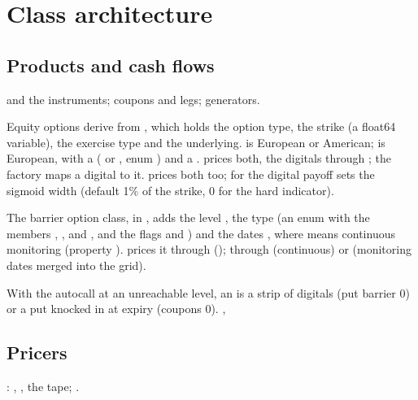\section{Class architecture}\label{sec:arch-classes}

\subsection{Products and cash flows}\label{sec:arch-products}
 and the instruments;  coupons and legs; generators.

\pending

Equity options derive from , which holds the option type, the strike (a float64 variable), the
exercise type and the underlying.  is European or American;  is European, with a
 ( or , enum ) and a .
 prices both, the digitals through ; the factory maps a digital to it.
 prices both too; for the digital payoff  sets the sigmoid width (default
1\% of the strike, 0 for the hard indicator). 

The barrier option class,  in , adds the level , the
type  (an enum  with the members , ,  and
, and the flags  and ) and the dates , where 
means continuous monitoring (property ).  prices it through 
();  through  (continuous) or
 (monitoring dates merged into the grid).

With the autocall at an unreachable level, an  is a strip of digitals (put barrier 0) or a
put knocked in at expiry (coupons 0).
, 

\subsection{Pricers}\label{sec:arch-pricers}
: , , the tape; .

